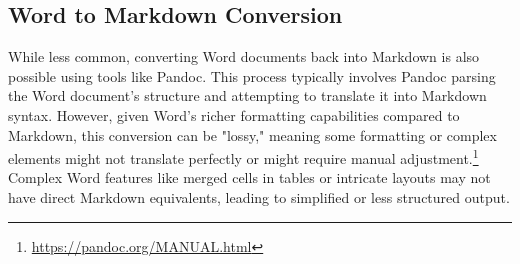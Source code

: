 \subsection{Word to Markdown Conversion}
While less common, converting Word documents back into Markdown is also possible using tools like Pandoc. This process typically involves Pandoc parsing the Word document's structure and attempting to translate it into Markdown syntax. However, given Word's richer formatting capabilities compared to Markdown, this conversion can be "lossy," meaning some formatting or complex elements might not translate perfectly or might require manual adjustment.\footnote{\url{https://pandoc.org/MANUAL.html}} Complex Word features like merged cells in tables or intricate layouts may not have direct Markdown equivalents, leading to simplified or less structured output.

